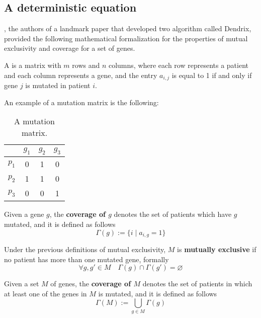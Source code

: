 \subsection{A deterministic equation}

\textcite{dendrix}, the authors of a landmark paper that developed two algorithm called Dendrix, provided the following mathematical formalization for the properties of mutual exclusivity and coverage for a set of genes.

\begin{definition} \label{mut_matrix_def}
    A  is a matrix with $m$ rows and $n$ columns, where each row represents a patient and each column represents a gene, and the entry $a_{i, j}$ is equal to 1 if and only if gene $j$ is mutated in patient $i$.
\end{definition}

\begin{example} \label{mutation_matrix}
    An example of a mutation matrix is the following:

    \begin{table}[H]
        \centering
        \begin{tabular}{c|ccc}
                  & $g_1$ & $g_2$ & $g_3$ \\
            \hline
            $p_1$ & 0 & 1 & 0 \\
            \hline
            $p_2$ & 1 & 1 & 0 \\
            \hline
            $p_3$ & 0 & 0 & 1 \\
        \end{tabular}
        \caption{A mutation matrix.}
    \end{table}
\end{example}

\begin{definition}
    Given a gene $g$, the \textbf{coverage of $g$} denotes the set of patients which have $g$ mutated, and it is defined as follows $$\Gamma(g) := \{i \mid a_{i, g} = 1\}$$ 
\end{definition}

Under the previous definitions of mutual exclusivity, $M$ is \textbf{mutually exclusive} if no patient has more than one mutated gene, formally $$\forall g, g' \in M \quad \Gamma(g) \cap \Gamma(g') = \varnothing$$

\begin{definition}
    Given a set $M$ of genes, the \textbf{coverage of $M$} denotes the set of patients in which at least one of the genes in $M$ is mutated, and it is defined as follows $$\Gamma(M) := \bigcup_{g \in M}{\Gamma(g)}$$
\end{definition}

